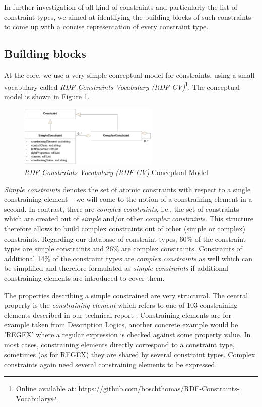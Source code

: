 \documentclass[a4paper,fontsize=11pt]{scrartcl}
\begin{document}
In further investigation of all kind of constraints and particularly the list of constraint types, we aimed at identifying the building blocks of such constraints to come up with a concise representation of every constraint type. 


\subsection{Building blocks}

At the core, we use a very simple conceptual model for constraints, using a small vocabulary called \emph{RDF Constraints Vocabulary (RDF-CV)}\footnote{Online available at: \url{https://github.com/boschthomas/RDF-Constraints-Vocabulary}}. The conceptual model is shown in Figure \ref{fig:RDF-CV-conceptual-model}.
\begin{figure}[H]
	\centering
		\includegraphics[width=0.60\textwidth]{images/RDF-CV.png}
	\caption{\emph{RDF Constraints Vocabulary (RDF-CV)} Conceptual Model}
	\label{fig:RDF-CV-conceptual-model}
\end{figure}

\emph{Simple constraints} denotes the set of atomic constraints with respect to a single constraining element -- we will come to the notion of a constraining element in a second. In contrast, there are  
\emph{complex constraints}, i.e., the set of constraints which are created out of \emph{simple} and/or other \emph{complex constraints}. This structure therefore allows to build complex constraints out of other (simple or complex) constraints. Regarding our database of constraint types, 60\% of the constraint types are simple constraints and 26\% are complex constraints. 
Constraints of additional 14\% of the constraint types are \emph{complex constraints} as well which can be simplified and therefore formulated as \emph{simple constraints} if additional constraining elements are introduced to cover them.

The properties describing a simple constrained are very structural. The central property is the \emph{constraining element} which refers to one of 103 constraining elements described in our technical report \cite{BoschNolleAcarEckert2015}. Constraining elements are for example taken from Description Logics, another concrete example would be 'REGEX' where a regular expression is checked against some property value. In most cases, constraining elements directly correspond to a constraint type, sometimes (as for REGEX) they are shared by several constraint types. Complex constraints again need several constraining elements to be expressed.
\end{document}
